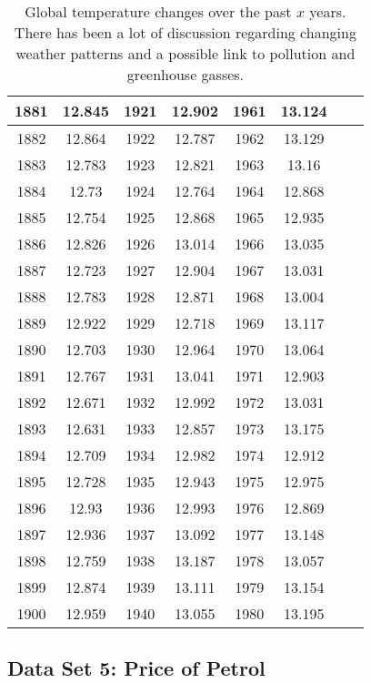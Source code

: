 \documentclass[10pt,a4paper,titlepage,twoside,openright]{report}
\begin{document}
\begin{table}[htb!]
\begin{center}
\begin{small}
\begin{tabular}{|c|c||c|c||c|c||c|c|}
1881 & 12.845 & 1921 & 12.902 & 1961 & 13.124 & & \\\hline
1882 & 12.864 & 1922 & 12.787 & 1962 & 13.129 & & \\\hline
1883 & 12.783 & 1923 & 12.821 & 1963 & 13.16 & & \\\hline
1884 & 12.73 & 1924 & 12.764 & 1964 & 12.868 & & \\\hline
1885 & 12.754 & 1925 & 12.868 & 1965 & 12.935 & & \\\hline
1886 & 12.826 & 1926 & 13.014 & 1966 & 13.035 & & \\\hline
1887 & 12.723 & 1927 & 12.904 & 1967 & 13.031 & & \\\hline
1888 & 12.783 & 1928 & 12.871 & 1968 & 13.004 & & \\\hline
1889 & 12.922 & 1929 & 12.718 & 1969 & 13.117 & & \\\hline
1890 & 12.703 & 1930 & 12.964 & 1970 & 13.064 & & \\\hline
1891 & 12.767 & 1931 & 13.041 & 1971 & 12.903 & & \\\hline
1892 & 12.671 & 1932 & 12.992 & 1972 & 13.031 & & \\\hline
1893 & 12.631 & 1933 & 12.857 & 1973 & 13.175 & & \\\hline
1894 & 12.709 & 1934 & 12.982 & 1974 & 12.912 & & \\\hline
1895 & 12.728 & 1935 & 12.943 & 1975 & 12.975 & & \\\hline
1896 & 12.93 & 1936 & 12.993 & 1976 & 12.869 & & \\\hline
1897 & 12.936 & 1937 & 13.092 & 1977 & 13.148 & & \\\hline
1898 & 12.759 & 1938 & 13.187 & 1978 & 13.057 & & \\\hline
1899 & 12.874 & 1939 & 13.111 & 1979 & 13.154 & & \\\hline
1900 & 12.959 & 1940 & 13.055 & 1980 & 13.195 & & \\\hline

\end{tabular}
\end{small}
\end{center}
\caption{Global temperature changes over the past $x$ years. There has been a lot of discussion regarding changing weather patterns and a possible link to pollution and greenhouse gasses.}
\label{tab:mdat:s:dataset4}
\end{table}

\subsection{Data Set 5: Price of Petrol}
\label{mdat:s:ed:dataset5}
\end{document}
